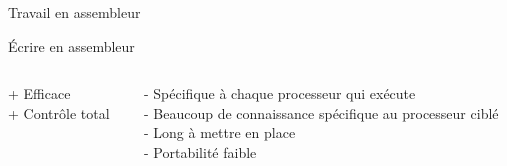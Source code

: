 \documentclass{backend/backend}
\begin{document}
\begin{frame}{Travail en assembleur}
        \centering
    \vfill
        \begin{blockSimple}{Écrire en assembleur}
        \begin{columns}
            \begin{column}{0.3\textwidth}
                + Efficace\\
                + Contrôle total
            \end{column}
            \begin{column}{0.5\textwidth}
            - Spécifique à chaque processeur qui exécute\\
            - Beaucoup de connaissance spécifique au processeur ciblé\\
            - Long à mettre en place\\
            - Portabilité faible
            \end{column}
        \end{columns}        
    \end{blockSimple}

     
\end{frame}
\end{document}
